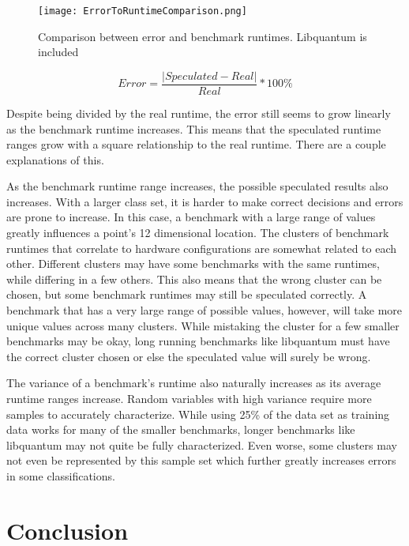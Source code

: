 \documentclass[10pt,twocolumn,letterpaper]{article}
\begin{document}
\begin{figure*}[t]
\centering
\texttt{[image: ErrorToRuntimeComparison.png]}
\caption{Comparison between error and benchmark runtimes. Libquantum is included}
\label{fig:ErrToRunComp}
\end{figure*}

\begin{displaymath}
Error=\frac{|Speculated-Real|}{Real}*100\%
\label{eq:ErrEq}
\end{displaymath}

Despite being divided by the real runtime, the error still seems to grow linearly as the benchmark runtime increases.
This means that the speculated runtime ranges grow with a square relationship to the real runtime.
There are a couple explanations of this.

As the benchmark runtime range increases, the possible speculated results also increases.
With a larger class set, it is harder to make correct decisions and errors are prone to increase.
In this case, a benchmark with a large range of values greatly influences a point’s 12 dimensional location.
The clusters of benchmark runtimes that correlate to hardware configurations are somewhat related to each other.
Different clusters may have some benchmarks with the same runtimes, while differing in a few others.
This also means that the wrong cluster can be chosen, but some benchmark runtimes may still be speculated correctly.
A benchmark that has a very large range of possible values, however, will take more unique values across many clusters.
While mistaking the cluster for a few smaller benchmarks may be okay, long running benchmarks like libquantum must have the correct cluster chosen or else the speculated value will surely be wrong.

The variance of a benchmark’s runtime also naturally increases as its average runtime ranges increase.
Random variables with high variance require more samples to accurately characterize.
While using 25\% of the data set as training data works for many of the smaller benchmarks, longer benchmarks like libquantum may not quite be fully characterized.
Even worse, some clusters may not even be represented by this sample set which further greatly increases errors in some classifications.

\section{Conclusion}
\end{document}
